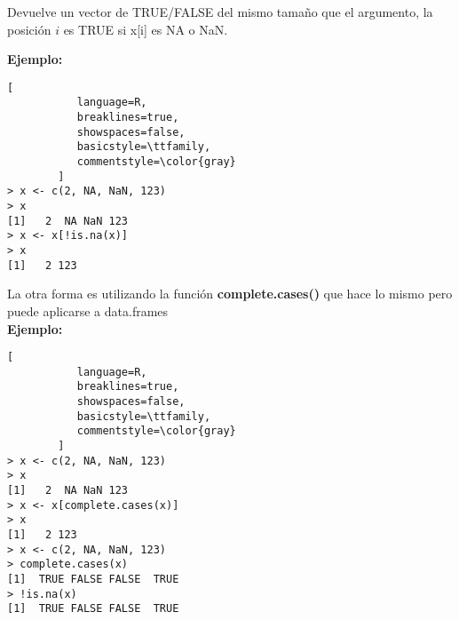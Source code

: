 \documentclass[11pt,fleqn]{book} %
\begin{document}
\begin{sintaxis}[is.na()]
Devuelve un vector de TRUE/FALSE del mismo tamaño que el argumento, la posición $i$ es TRUE si x[i] es NA o NaN.
\end{sintaxis}
\textbf{Ejemplo:}
\begin{lstlisting}[
           language=R,
           breaklines=true,
           showspaces=false,
           basicstyle=\ttfamily,
           commentstyle=\color{gray}
        ]
> x <- c(2, NA, NaN, 123)
> x
[1]   2  NA NaN 123
> x <- x[!is.na(x)]
> x
[1]   2 123
\end{lstlisting}
La otra forma es utilizando la función \textbf{complete.cases()} que hace lo mismo pero puede aplicarse a data.frames\\
\textbf{Ejemplo:}
\begin{lstlisting}[
           language=R,
           breaklines=true,
           showspaces=false,
           basicstyle=\ttfamily,
           commentstyle=\color{gray}
        ]
> x <- c(2, NA, NaN, 123)
> x
[1]   2  NA NaN 123
> x <- x[complete.cases(x)]
> x
[1]   2 123
> x <- c(2, NA, NaN, 123)
> complete.cases(x)
[1]  TRUE FALSE FALSE  TRUE
> !is.na(x)
[1]  TRUE FALSE FALSE  TRUE
\end{lstlisting}
\end{document}
